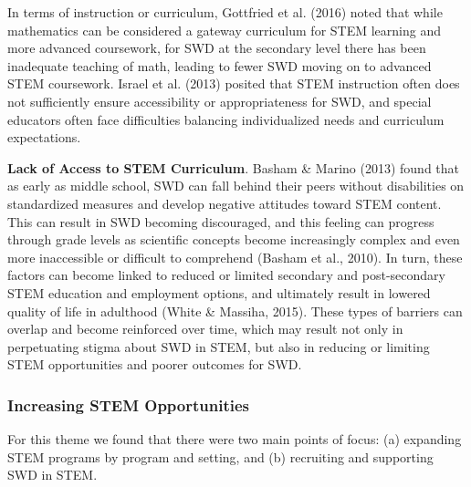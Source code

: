 \documentclass[11.5pt]{sig-alternate}
\begin{document}
\begin{large}
In terms of instruction or curriculum, Gottfried et al. (2016) noted that while mathematics can be considered a gateway curriculum for STEM learning and more advanced coursework, for SWD at the secondary level there has been inadequate teaching of math, leading to fewer SWD moving on to advanced STEM coursework. Israel et al. (2013) posited that STEM instruction often does not sufficiently ensure accessibility or appropriateness for SWD, and special educators often face difficulties balancing individualized needs and curriculum expectations.     

\textbf{Lack of Access to STEM Curriculum}. Basham \& Marino (2013) found that as early as middle school, SWD can fall behind their peers without disabilities on standardized measures and develop negative attitudes toward STEM content. This can result in SWD becoming discouraged, and this feeling can progress through grade levels as scientific concepts become increasingly complex and even more inaccessible or difficult to comprehend (Basham et al., 2010). In turn, these factors can become linked to reduced or limited secondary and post-secondary STEM education and employment options, and ultimately result in lowered quality of life in adulthood (White \& Massiha, 2015). These types of barriers can overlap and become reinforced over time, which may result not only in perpetuating stigma about SWD in STEM, but also in reducing or limiting STEM opportunities and poorer outcomes for SWD.     

\subsubsection*{Increasing STEM Opportunities}
For this theme we found that there were two main points of focus: (a) expanding STEM programs by program and setting, and (b) recruiting and supporting SWD in STEM.   


\end{large}
\end{document}
